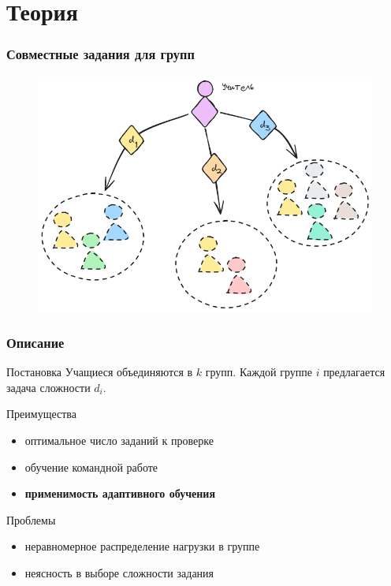 \section{Теория}

\begin{frame}
    \frametitle{Совместные задания для групп}
    \centering
    \begin{figure}
        \includegraphics[width=0.8\linewidth]{assets/setting/groups.excalidraw.png}
    \end{figure}
\end{frame}

\begin{frame}
    \frametitle{Описание}
    \begin{block}{Постановка}
        Учащиеся объединяются в $k$ групп. Каждой группе $i$ предлагается задача сложности $d_i$. 
    \end{block}

    \begin{exampleblock}{Преимущества}
        \begin{itemize}
            \item оптимальное число заданий к проверке
            \item обучение командной работе
            \item \textbf{применимость адаптивного обучения} 
        \end{itemize}
    \end{exampleblock}

    \begin{alertblock}{Проблемы}
        \begin{itemize}
            \item неравномерное распределение нагрузки в группе
            \item неясность в выборе сложности задания
        \end{itemize}
    \end{alertblock}
\end{frame}


